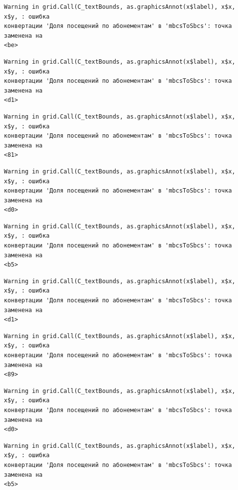 \documentclass[
  letterpaper,
  DIV=11,
  numbers=noendperiod]{scrreprt}
\begin{document}
\begin{verbatim}
Warning in grid.Call(C_textBounds, as.graphicsAnnot(x$label), x$x, x$y, : ошибка
конвертации 'Доля посещений по абонементам' в 'mbcsToSbcs': точка заменена на
<be>
\end{verbatim}

\begin{verbatim}
Warning in grid.Call(C_textBounds, as.graphicsAnnot(x$label), x$x, x$y, : ошибка
конвертации 'Доля посещений по абонементам' в 'mbcsToSbcs': точка заменена на
<d1>
\end{verbatim}

\begin{verbatim}
Warning in grid.Call(C_textBounds, as.graphicsAnnot(x$label), x$x, x$y, : ошибка
конвертации 'Доля посещений по абонементам' в 'mbcsToSbcs': точка заменена на
<81>
\end{verbatim}

\begin{verbatim}
Warning in grid.Call(C_textBounds, as.graphicsAnnot(x$label), x$x, x$y, : ошибка
конвертации 'Доля посещений по абонементам' в 'mbcsToSbcs': точка заменена на
<d0>
\end{verbatim}

\begin{verbatim}
Warning in grid.Call(C_textBounds, as.graphicsAnnot(x$label), x$x, x$y, : ошибка
конвертации 'Доля посещений по абонементам' в 'mbcsToSbcs': точка заменена на
<b5>
\end{verbatim}

\begin{verbatim}
Warning in grid.Call(C_textBounds, as.graphicsAnnot(x$label), x$x, x$y, : ошибка
конвертации 'Доля посещений по абонементам' в 'mbcsToSbcs': точка заменена на
<d1>
\end{verbatim}

\begin{verbatim}
Warning in grid.Call(C_textBounds, as.graphicsAnnot(x$label), x$x, x$y, : ошибка
конвертации 'Доля посещений по абонементам' в 'mbcsToSbcs': точка заменена на
<89>
\end{verbatim}

\begin{verbatim}
Warning in grid.Call(C_textBounds, as.graphicsAnnot(x$label), x$x, x$y, : ошибка
конвертации 'Доля посещений по абонементам' в 'mbcsToSbcs': точка заменена на
<d0>
\end{verbatim}

\begin{verbatim}
Warning in grid.Call(C_textBounds, as.graphicsAnnot(x$label), x$x, x$y, : ошибка
конвертации 'Доля посещений по абонементам' в 'mbcsToSbcs': точка заменена на
<b5>
\end{verbatim}
\end{document}
